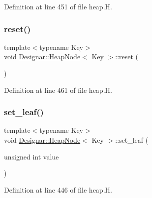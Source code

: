 Definition at line 451 of file heap.\+H.

\mbox{\label{class_designar_1_1_heap_node_a60340ca59bc0968899e960bc9d1b08b3}} 
\subsubsection{\texorpdfstring{reset()}{reset()}}
{\footnotesize\ttfamily template$<$typename Key$>$ \\
void \hyperlink{class_designar_1_1_heap_node}{Designar\+::\+Heap\+Node}$<$ Key $>$\+::reset (\begin{DoxyParamCaption}{ }\end{DoxyParamCaption})\hspace{0.3cm}{\ttfamily [inline]}}



Definition at line 461 of file heap.\+H.

\mbox{\label{class_designar_1_1_heap_node_a34ec910a7402b356d7b3d67200f794ec}} 
\subsubsection{\texorpdfstring{set\+\_\+leaf()}{set\_leaf()}}
{\footnotesize\ttfamily template$<$typename Key$>$ \\
void \hyperlink{class_designar_1_1_heap_node}{Designar\+::\+Heap\+Node}$<$ Key $>$\+::set\+\_\+leaf (\begin{DoxyParamCaption}\item[{unsigned int}]{value }\end{DoxyParamCaption})\hspace{0.3cm}{\ttfamily [inline]}}



Definition at line 446 of file heap.\+H.

\mbox{\label{class_designar_1_1_heap_node_a65a5b3a38d152072e756182600502d93}} 
